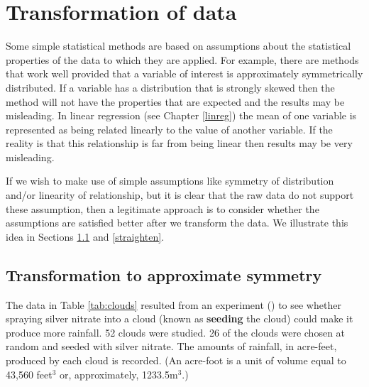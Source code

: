 \documentclass[
  11pt,
  british,
  openany, a4paper]{book}
\begin{document}
\hypertarget{transformation-of-data}{%
\section{Transformation of data}\label{transformation-of-data}}

Some simple statistical methods are based on assumptions about the statistical properties of the data to which they are applied. For example, there are methods that work well provided that a variable of interest is approximately symmetrically distributed. If a variable has a distribution that is strongly skewed then the method will not have the properties that are expected and the results may be misleading. In linear regression (see Chapter \ref{linreg}) the mean of one variable is represented as being related linearly to the value of another variable. If the reality is that this relationship is far from being linear then results may be very misleading.

If we wish to make use of simple assumptions like symmetry of distribution and/or linearity of relationship, but it is clear that the raw data do not support these assumption, then a legitimate approach is to consider whether the assumptions are satisfied better after we transform the data. We illustrate this idea in Sections \ref{transsymmetry} and \ref{straighten}.

\hypertarget{transsymmetry}{%
\subsection{Transformation to approximate symmetry}\label{transsymmetry}}

The data in Table \ref{tab:clouds} resulted from an experiment (\citet{clouds}) to see whether spraying silver nitrate into a cloud (known as \textbf{seeding} the cloud)
could make it produce more rainfall. 52 clouds were studied. 26 of the clouds were chosen at random and seeded with silver nitrate. The amounts of rainfall, in acre-feet, produced by each cloud is recorded. (An acre-foot is a unit of volume equal to 43,560 feet\(^3\) or, approximately, 1233.5m\(^3\).)

 
  \providecommand{\huxb}[2]{\arrayrulecolor[RGB]{#1}\global\arrayrulewidth=#2pt}
  \providecommand{\huxvb}[2]{\color[RGB]{#1}\vrule width #2pt}
  \providecommand{\huxtpad}[1]{\rule{0pt}{#1}}
  \providecommand{\huxbpad}[1]{\rule[-#1]{0pt}{#1}}
\end{document}
